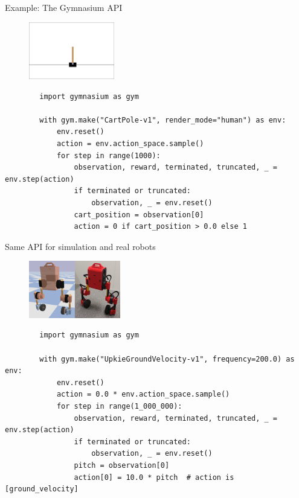 \documentclass[10pt, aspectratio=1610]{beamer}
\begin{document}
\begin{frame}[fragile]{Example: The Gymnasium API}
    \begin{figure}
        \includegraphics[height=2.5cm]{figures/cart-pole.png}
    \end{figure}
    \begin{verbatim}
        import gymnasium as gym

        with gym.make("CartPole-v1", render_mode="human") as env:
            env.reset()
            action = env.action_space.sample()
            for step in range(1000):
                observation, reward, terminated, truncated, _ = env.step(action)
                if terminated or truncated:
                    observation, _ = env.reset()
                cart_position = observation[0]
                action = 0 if cart_position > 0.0 else 1
    \end{verbatim}
\end{frame}

\begin{frame}[fragile]{Same API for simulation and real robots}
    \begin{figure}
        \includegraphics[height=2.5cm]{figures/upkie-sim-real.png}
    \end{figure}
    \begin{verbatim}
        import gymnasium as gym

        with gym.make("UpkieGroundVelocity-v1", frequency=200.0) as env:
            env.reset()
            action = 0.0 * env.action_space.sample()
            for step in range(1_000_000):
                observation, reward, terminated, truncated, _ = env.step(action)
                if terminated or truncated:
                    observation, _ = env.reset()
                pitch = observation[0]
                action[0] = 10.0 * pitch  # action is [ground_velocity]
    \end{verbatim}
\end{frame}
\end{document}
